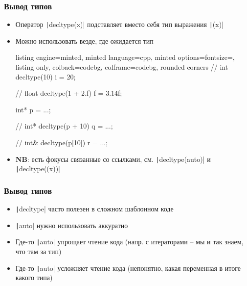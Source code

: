 \documentclass[10pt]{beamer}
\begin{document}
\begin{frame}[fragile]
\frametitle{Вывод типов}
\begin{itemize}
\item Оператор \texttt|decltype(x)| подставляет вместо себя тип выражения \texttt|(x)|
\pause
\item Можно использовать везде, где ожидается тип
\pause
{}
\begin{tcblisting}{listing engine=minted, minted language=cpp, minted options={fontsize=\scriptsize}, listing only, colback=codebg, colframe=codebg, rounded corners}
// int
decltype(10) i = 20;

// float
decltype(1 + 2.f) f = 3.14f;

int* p = ...;

// int*
decltype(p + 10) q = ...;

// int&
decltype(p[10]) r = ...;
\end{tcblisting}
\pause
{}
\item \textbf{NB}: есть фокусы связанные со ссылками, см. \texttt|decltype(auto)| и \texttt|decltype((x))|
\end{itemize}
\end{frame}

\begin{frame}[fragile]
\frametitle{Вывод типов}
\begin{itemize}
\item \texttt|decltype| часто полезен в сложном шаблонном коде
\pause
\item \texttt|auto| нужно использовать аккуратно
\pause
\item Где-то \texttt|auto| упрощает чтение кода (напр. с итераторами -- мы и так знаем, что там за тип)
\pause
\item Где-то \texttt|auto| усложняет чтение кода (непонятно, какая переменная в итоге какого типа)
\end{itemize}
\end{frame}
\end{document}
